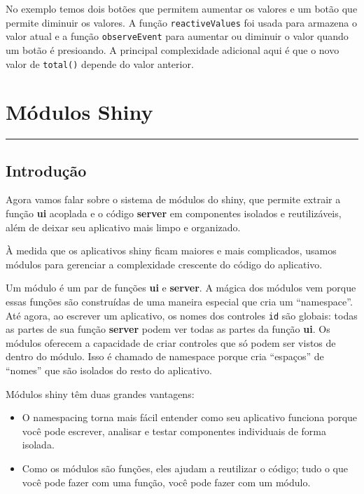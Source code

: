 \documentclass[
]{book}
\begin{document}
No exemplo temos dois botões que permitem aumentar os valores e um botão que permite diminuir os valores. A função \texttt{reactiveValues} foi usada para armazena o valor atual e a função \texttt{observeEvent} para aumentar ou diminuir o valor quando um botão é presioando. A principal complexidade adicional aqui é que o novo valor de \texttt{total()} depende do valor anterior.

\hypertarget{muxf3dulos-shiny}{%
\chapter{\texorpdfstring{\textbf{Módulos Shiny}}{Módulos Shiny}}\label{muxf3dulos-shiny}}

\begin{center}\rule{0.5\linewidth}{0.5pt}\end{center}

\hypertarget{introduuxe7uxe3o-2}{%
\section{\texorpdfstring{\textbf{Introdução}}{Introdução}}\label{introduuxe7uxe3o-2}}

Agora vamos falar sobre o sistema de módulos do shiny, que permite extrair a função \textbf{ui} acoplada e o código \textbf{server} em componentes isolados e reutilizáveis, além de deixar seu aplicativo mais limpo e organizado.

À medida que os aplicativos shiny ficam maiores e mais complicados, usamos módulos para gerenciar a complexidade crescente do código do aplicativo.

Um módulo é um par de funções \textbf{ui} e \textbf{server}. A mágica dos módulos vem porque essas funções são construídas de uma maneira especial que cria um ``namespace''. Até agora, ao escrever um aplicativo, os nomes dos controles \texttt{id} são globais: todas as partes de sua função \textbf{server} podem ver todas as partes da função \textbf{ui}. Os módulos oferecem a capacidade de criar controles que só podem ser vistos de dentro do módulo. Isso é chamado de namespace porque cria ``espaços'' de ``nomes'' que são isolados do resto do aplicativo.

Módulos shiny têm duas grandes vantagens:

\begin{itemize}
\item
  O namespacing torna mais fácil entender como seu aplicativo funciona porque você pode escrever, analisar e testar componentes individuais de forma isolada.
\item
  Como os módulos são funções, eles ajudam a reutilizar o código; tudo o que você pode fazer com uma função, você pode fazer com um módulo.
\end{itemize}
\end{document}
